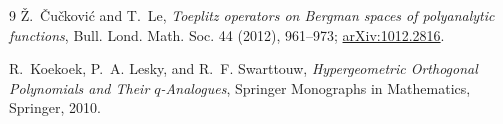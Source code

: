 \documentclass[11pt]{article}
\begin{document}
\begin{thebibliography}{9}
\v{Z}.~\v{C}u\v{c}kovi\'c and T.~Le,
\emph{Toeplitz operators on Bergman spaces of polyanalytic functions},
Bull. Lond. Math. Soc. 44 (2012), 961--973;
\href{https://arxiv.org/abs/1012.2816}{arXiv:1012.2816}.

R.~Koekoek, P.~A. Lesky, and R.~F. Swarttouw,
\emph{Hypergeometric Orthogonal Polynomials and Their $q$-Analogues},
Springer Monographs in Mathematics, Springer, 2010.
\end{thebibliography}
\end{document}
